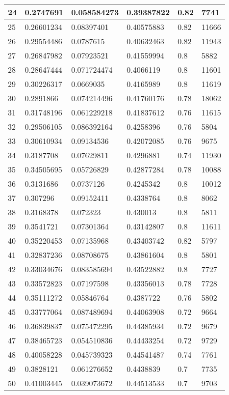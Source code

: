 \begin{longtable}{|l|l|l|l|l|l|}
24 & 0.2747691 & 0.058584273 & 0.39387822 & 0.82 & 7741 \\ \hline 
25 & 0.26601234 & 0.08397401 & 0.40575883 & 0.82 & 11666 \\ \hline 
26 & 0.29554486 & 0.0787615 & 0.40632463 & 0.82 & 11943 \\ \hline 
27 & 0.26847982 & 0.07923521 & 0.41559994 & 0.8 & 5882 \\ \hline 
28 & 0.28647444 & 0.071724474 & 0.4066119 & 0.8 & 11601 \\ \hline 
29 & 0.30226317 & 0.0669035 & 0.4165989 & 0.8 & 11619 \\ \hline 
30 & 0.2891866 & 0.074214496 & 0.41760176 & 0.78 & 18062 \\ \hline 
31 & 0.31748196 & 0.061229218 & 0.41837612 & 0.76 & 11615 \\ \hline 
32 & 0.29506105 & 0.086392164 & 0.4258396 & 0.76 & 5804 \\ \hline 
33 & 0.30610934 & 0.09134536 & 0.42072085 & 0.76 & 9675 \\ \hline 
34 & 0.3187708 & 0.07629811 & 0.4296881 & 0.74 & 11930 \\ \hline 
35 & 0.34505695 & 0.05726829 & 0.42877284 & 0.78 & 10088 \\ \hline 
36 & 0.3131686 & 0.0737126 & 0.4245342 & 0.8 & 10012 \\ \hline 
37 & 0.307296 & 0.09152411 & 0.4338764 & 0.8 & 8062 \\ \hline 
38 & 0.3168378 & 0.072323 & 0.430013 & 0.8 & 5811 \\ \hline 
39 & 0.3541721 & 0.07301364 & 0.43142807 & 0.8 & 11611 \\ \hline 
40 & 0.35220453 & 0.07135968 & 0.43403742 & 0.82 & 5797 \\ \hline 
41 & 0.32837236 & 0.08708675 & 0.43861604 & 0.8 & 5801 \\ \hline 
42 & 0.33034676 & 0.083585694 & 0.43522882 & 0.8 & 7727 \\ \hline 
43 & 0.33572823 & 0.07197598 & 0.43356013 & 0.78 & 7728 \\ \hline 
44 & 0.35111272 & 0.05846764 & 0.4387722 & 0.76 & 5802 \\ \hline 
45 & 0.33777064 & 0.087489694 & 0.44063908 & 0.72 & 9664 \\ \hline 
46 & 0.36839837 & 0.075472295 & 0.44385934 & 0.72 & 9679 \\ \hline 
47 & 0.38465723 & 0.054510836 & 0.44433254 & 0.72 & 9729 \\ \hline 
48 & 0.40058228 & 0.045739323 & 0.44541487 & 0.74 & 7761 \\ \hline 
49 & 0.3828121 & 0.061276652 & 0.4438839 & 0.7 & 7735 \\ \hline 
50 & 0.41003445 & 0.039073672 & 0.44513533 & 0.7 & 9703 \\ \hline 
\end{longtable}